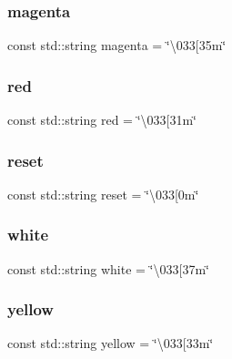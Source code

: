 \mbox{\label{_logger_8cpp_a9c3c2560b6f423f7902776457532fdba}} 
\subsubsection{magenta}
{\footnotesize\ttfamily const std\+::string magenta = \char`\"{}\textbackslash{}033[35m\char`\"{}}

\mbox{\label{_logger_8cpp_acb5d1f5a5f86e947972f13be5e9bc5c8}} 
\subsubsection{red}
{\footnotesize\ttfamily const std\+::string red = \char`\"{}\textbackslash{}033[31m\char`\"{}}

\mbox{\label{_logger_8cpp_a6ea20d23dc6f0e5681125ae9108d61e9}} 
\subsubsection{reset}
{\footnotesize\ttfamily const std\+::string reset = \char`\"{}\textbackslash{}033[0m\char`\"{}}

\mbox{\label{_logger_8cpp_aa43aab7dde2acab2faa29544ea9e02ec}} 
\subsubsection{white}
{\footnotesize\ttfamily const std\+::string white = \char`\"{}\textbackslash{}033[37m\char`\"{}}

\mbox{\label{_logger_8cpp_ad2360f7af7d877c5a313e9ca50b65e8a}} 
\subsubsection{yellow}
{\footnotesize\ttfamily const std\+::string yellow = \char`\"{}\textbackslash{}033[33m\char`\"{}}

